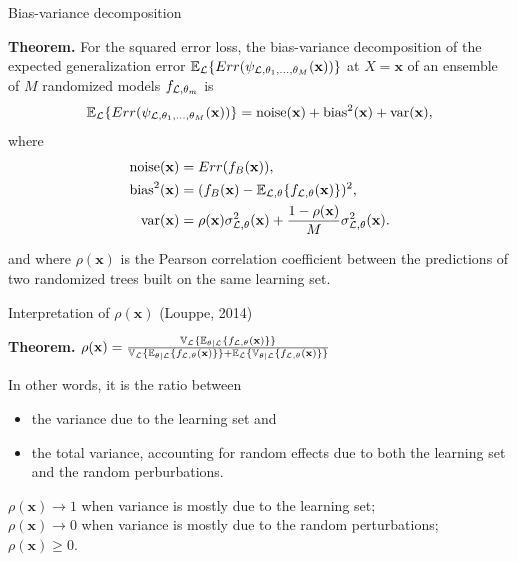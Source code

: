 \documentclass{beamer}
\begin{document}
\begin{frame}{Bias-variance decomposition}

{\bf Theorem.}
For the squared error loss, the bias-variance decomposition of the expected
generalization error $\mathbb{E}_{\cal L} \{ Err( \psi_{{\cal L},\theta_1,\dots,\theta_M}(\mathbf{x}))
\}$ at $X=\mathbf{x}$ of an ensemble of $M$ randomized models $f_{{\cal L},\theta_m}$ is
\begin{equation*}
\mathbb{E}_{\cal L} \{ Err(\psi_{{\cal L},\theta_1,\dots,\theta_M}(\mathbf{x})) \} = \text{noise}(\mathbf{x}) + \text{bias}^2(\mathbf{x}) + \text{var}(\mathbf{x}),
\end{equation*}
where
\begin{align*}
\text{noise}(\mathbf{x}) &= Err(f_B(\mathbf{x})), \\
\text{bias}^2(\mathbf{x}) &= (f_B(\mathbf{x}) - \mathbb{E}_{{\cal L},\theta} \{ f_{{\cal L},\theta}(\mathbf{x}) \} )^2, \\
\text{var}(\mathbf{x}) &= \rho(\mathbf{x}) \sigma^2_{{\cal L},\theta}(\mathbf{x}) + \frac{1 - \rho(\mathbf{x})}{M} \sigma^2_{{\cal L},\theta}(\mathbf{x}).
\end{align*}

and where $\rho(\mathbf{x})$ is the Pearson correlation coefficient between
the predictions of two randomized trees built on the same learning set.

\end{frame}

\begin{frame}{Interpretation of $\rho(\mathbf{x})$ {\scriptsize (Louppe, 2014)}}

{\bf Theorem.} $\rho(\mathbf{x}) = \frac{\mathbb{V}_{\cal L} \{ \mathbb{E}_{\theta|{\cal L}} \{ f_{{\cal L},\theta}(\mathbf{x}) \} \}}{\mathbb{V}_{\cal L} \{ \mathbb{E}_{\theta|{\cal L}} \{ f_{{\cal L},\theta}(\mathbf{x}) \} \} + \mathbb{E}_{\cal L} \{ \mathbb{V}_{\theta|{\cal L}} \{ f_{{\cal L},\theta}(\mathbf{x}) \} \}}$

\vspace{1cm}

In other words, it is the ratio between
\begin{itemize}
\item the variance due to the learning set and
\item the total variance, accounting for random effects due to both the
  learning set and the random perburbations.
\end{itemize}

\bigskip

$\rho(\mathbf{x}) \to 1$ when variance is mostly due to the learning set; \\
$\rho(\mathbf{x}) \to 0$ when variance is mostly due to the random perturbations;\\
$\rho(\mathbf{x}) \geq 0$.


\end{frame}
\end{document}
